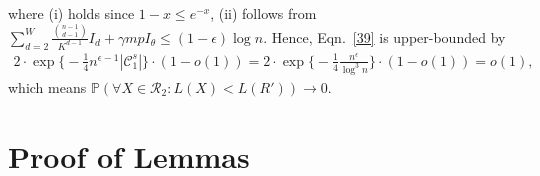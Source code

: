 \documentclass{article}
\begin{document}
where (i) holds since $1-x \leq e^{-x}$, (ii) follows from $ \sum_{d=2}^{W} \frac{\binom{n-1}{d-1}}{K^{d-1}} I_d + \gamma m p I_\theta \leq (1-\epsilon) \log n$.
Hence, Eqn.~\eqref{39} is upper-bounded by
\begin{equation}
    \begin{aligned}
        2 \cdot \exp \Big\{ - \frac{1}{4} n^{\epsilon-1} |\mathcal{C}_1^s| \Big\} \cdot (1-o(1)) = 2 \cdot \exp \Big\{ - \frac{1}{4}  \frac{n^{\epsilon}}{\log^3 n} \Big\} \cdot (1-o(1)) = o(1),
    \end{aligned}
\end{equation}
which means $\mathbb{P} (\forall X \in \mathcal{R}_2: L(X)<L(R')) \rightarrow 0$.


\section{Proof of Lemmas}\label{section5}
\end{document}
